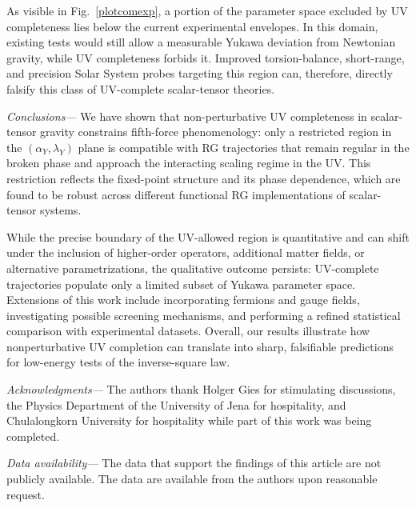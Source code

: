 \documentclass[reprint,superscriptaddress,amsmath,amssymb,aps,prl,floatfix]{revtex4-2}
\def\paragraph#1{
   \textit{#1}
  \unskip
}
\newcommand{\alphay}{\alpha_Y}
\newcommand{\lamy}{\lambda_Y}
\begin{document}
As visible in Fig.~\ref{plotcomexp}, a portion of the parameter space excluded by UV completeness lies below the current experimental envelopes. In this domain, existing tests would still allow a measurable Yukawa deviation from Newtonian gravity, while UV completeness forbids it. Improved torsion-balance, short-range, and precision Solar System probes targeting this region can,  therefore, directly falsify this class of UV-complete scalar-tensor theories.

\paragraph{Conclusions—}We have shown that non-perturbative UV completeness in scalar-tensor gravity constrains fifth-force phenomenology: only a restricted region in the $(\alphay,\lamy)$ plane is compatible with RG trajectories that remain regular in the broken phase and approach the interacting scaling regime in the UV. This restriction reflects the fixed-point structure and its phase dependence, which are found to be robust across different functional RG implementations of scalar-tensor systems.

While the precise boundary of the UV-allowed region is quantitative and can shift under the inclusion of higher-order operators, additional matter fields, or alternative parametrizations, the qualitative outcome persists: UV-complete trajectories populate only a limited subset of Yukawa parameter space. Extensions of this work include incorporating fermions and gauge fields, investigating possible screening mechanisms, and performing a refined statistical comparison with experimental datasets. Overall, our results illustrate how nonperturbative UV completion can translate into sharp, falsifiable predictions for low-energy tests of the inverse-square law.







\paragraph{Acknowledgments—}The authors thank Holger Gies for stimulating discussions, the Physics Department of the University of Jena for hospitality, and Chulalongkorn University for hospitality while part of this work was being completed.

\paragraph{Data availability—}The data that support the findings  of this article are not publicly available. The  data are available  from the  authors upon reasonable request.




\end{document}
